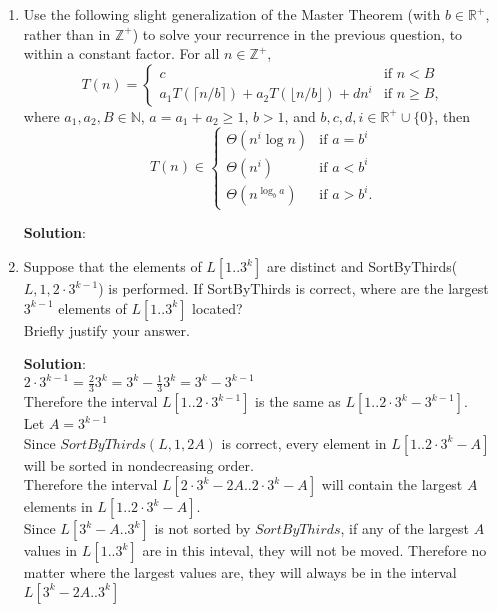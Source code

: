 \documentclass[11pt]{article}
\def\nats {{\mathbb N}}
\def\ints {{\mathbb Z}}
\def\reals {{\mathbb R}}
\begin{document}
\begin{enumerate}
\item
\begin{question}
Use the following slight generalization of the Master Theorem
(with $b \in \reals^+$, rather than in $\ints^+$)
to solve your
recurrence in the previous question, to within a constant factor.
For all $n \in \ints^+$,
$$T(n) = \left\{
\begin{array}{ll}
c &  \mbox{if } n < B\\
a_1 T( \lceil n/b \rceil) + a_2 T( \lfloor n/b \rfloor) + dn^i & \mbox{if } n \geq B,
\end{array} \right .$$
where $a_1, a_2, B\in \nats$, $a = a_1 + a_2 \geq 1$, $b > 1$,  and $b,c,d, i \in \reals^+ \cup \{0\}$, then
$$T(n) \in \left\{
\begin{array}{ll}
\Theta(n^i \log n) &  \mbox{if } a= b^i\\
\Theta(n^i ) &  \mbox{if } a< b^i\\
\Theta(n^{\log_b a}) &  \mbox{if } a>  b^i.
\end{array} \right .$$
\end{question}

\begin{solution}
{\bf Solution}:\\

\end{solution}

\item
\begin{question}
Suppose that
the elements of $L[1..3^k]$ are distinct and SortByThirds($L,1,2\cdot3^{k-1}$) is performed.
If SortByThirds is correct,
where are the largest $3^{k-1}$ elements of $L[1..3^k]$ located?\\
Briefly justify your answer.
\end{question}

\begin{solution}
{\bf Solution}:\\
$2\cdot3^{k-1} = \frac23 3^k = 3^k - \frac13 3^k = 3^k - 3^{k-1}$ \\
Therefore the interval $L[1..2\cdot3^{k-1}]$ is the same as $L[1..2\cdot3^{k} - 3^{k-1}]$.\\
Let $A = 3^{k-1}$\\
Since $SortByThirds(L, 1, 2A)$ is correct, every element in $L[1..2\cdot3^{k} -A]$ will be sorted in nondecreasing order. \\
Therefore the interval $L[2\cdot3^{k} - 2A..2\cdot3^{k} - A]$ will contain the largest $A$ elements in $L[1..2\cdot3^{k} - A]$.\\
Since $L[3^k-A..3^k]$ is not sorted by $SortByThirds$, if any of the largest $A$ values in $L[1..3^k]$ are in this inteval, they will not be moved. Therefore no matter where the largest values are, they will always be in the interval $L[3^k-2A..3^k]$\\


\end{solution}
\end{enumerate}
\end{document}

